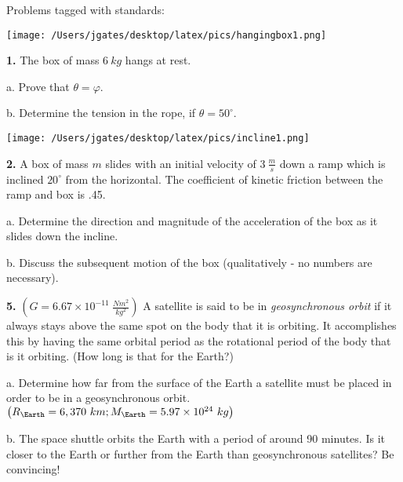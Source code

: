 

{\Large Problems tagged with standards:}


\begin{floatingfigure}[r]{.2\textwidth}
\texttt{[image: /Users/jgates/desktop/latex/pics/hangingbox1.png]}
\end{floatingfigure}
 
{\bf \Large{1.}} The box of mass ${6~kg}$ hangs at rest. 

\bigskip

\indent  a. Prove that ${\theta = \varphi}$.

\vfill

b. Determine the tension in the rope, if ${\theta = 50^\circ}$.

\vfill

\newpage

\begin{floatingfigure}[r]{.25\textwidth}
\texttt{[image: /Users/jgates/desktop/latex/pics/incline1.png]}
\end{floatingfigure} 

{\bf \Large{2.}} A box of mass ${m}$ slides with an initial velocity of ${3~\tfrac{m}{s}}$ down a ramp which is inclined ${20^\circ}$ from the horizontal.  The coefficient of kinetic friction between the ramp and box is .45.

\bigskip

\indent  a. Determine the direction and magnitude of the acceleration of the box as it slides down the incline. 

\vfill

b. Discuss the subsequent motion of the box (qualitatively - no numbers are necessary).

\vspace{25mm}

\newpage%

{\bf \Large{5.}} ${\left ( G = 6.67 \times 10^{-11}~\tfrac{Nm^2}{kg^2} \right )}$ A satellite is said to be in \emph{geosynchronous orbit} if it always stays above the same spot on the body that it is orbiting.  It accomplishes this by having the same orbital period as the rotational period of the body that is it orbiting. (How long is that for the Earth?)

\bigskip

a. Determine how far from the surface of the Earth a satellite must be placed in order to be in a geosynchronous orbit. ${\left ( R_{\Earth} = 6,370~km; M_{\Earth}=5.97 \times 10^{24}~kg \right )}$

\vfill

b. The space shuttle orbits the Earth with a period of around 90 minutes.  Is it closer to the Earth or further from the Earth than geosynchronous satellites?  Be convincing!

\vspace{25mm}
 
\newpage
